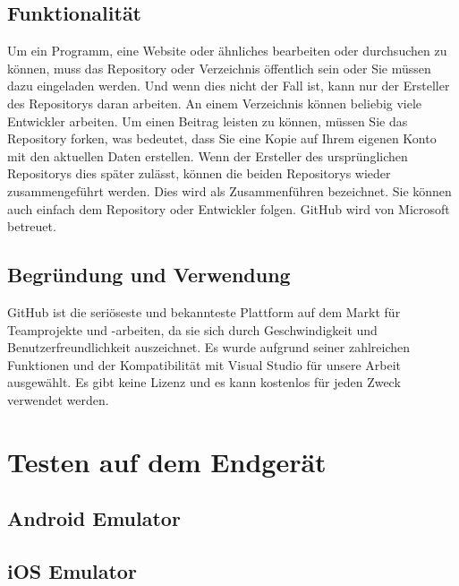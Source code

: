 \subsection*{Funktionalität}
Um ein Programm, eine Website oder ähnliches bearbeiten oder durchsuchen zu können, 
muss das Repository oder Verzeichnis öffentlich sein oder Sie müssen dazu eingeladen 
werden. Und wenn dies nicht der Fall ist, kann nur der Ersteller des Repositorys 
daran arbeiten. An einem Verzeichnis können beliebig viele Entwickler arbeiten. 
Um einen Beitrag leisten zu können, müssen Sie das Repository forken, was bedeutet, 
dass Sie eine Kopie auf Ihrem eigenen Konto mit den aktuellen Daten erstellen. 
Wenn der Ersteller des ursprünglichen Repositorys dies später zulässt, können die 
beiden Repositorys wieder zusammengeführt werden. Dies wird als Zusammenführen 
bezeichnet. Sie können auch einfach dem Repository oder Entwickler folgen. 
GitHub wird von Microsoft betreuet.
\subsection*{Begründung und Verwendung}
GitHub ist die seriöseste und bekannteste Plattform auf dem Markt für Teamprojekte 
und -arbeiten, da sie sich durch Geschwindigkeit und Benutzerfreundlichkeit 
auszeichnet. Es wurde aufgrund seiner zahlreichen Funktionen und der Kompatibilität 
mit Visual Studio für unsere Arbeit ausgewählt. Es gibt keine Lizenz und es kann 
kostenlos für jeden Zweck verwendet werden.
\newpage

\section{Testen auf dem Endgerät}
\subsection{Android Emulator}

\subsection{iOS Emulator}
